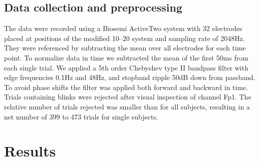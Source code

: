 \documentclass[a4paper,twocolumn]{article}
\begin{document}
\subsection*{Data collection and preprocessing}
The data were recorded using a Biosemi ActiveTwo system with 32 electrodes placed at positions of the modified 10--20 system and sampling rate of 2048Hz. They were referenced by subtracting the mean over all electrodes for each time point. To normalize data in time we subtracted the mean of the first 50ms from each single trial. We applied a 5th order Chebyshev type II bandpass filter with edge frequencies 0.1Hz and 48Hz, and stopband ripple 50dB down from passband. To avoid phase shifts the filter was applied both forward and backward in time.
Trials containing blinks were rejected after visual inspection of channel Fp1. The relative number of trials rejected was smaller than  for all subjects, resulting in a net number of 399 to 473 trials for single subjects. 
\section*{Results}
\end{document}
